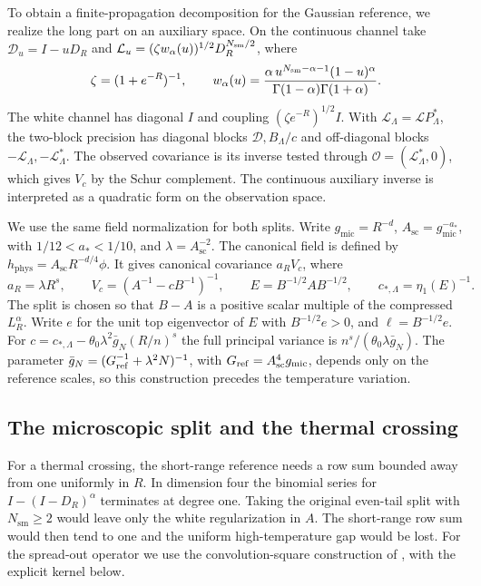 \documentclass[11pt]{article}
\theoremstyle{definition}
\begin{document}
To obtain a finite-propagation decomposition for the Gaussian
reference, we realize the long part on an auxiliary space. On the
continuous channel take
\(\mathcal D_u=I-uD_R\) and
\(\mathcal L_u=(\zeta w_\alpha(u))^{1/2}D_R^{N_{\rm sm}/2}\), where
\begin{equation}
 \zeta=(1+e^{-R})^{-1},\qquad
 w_\alpha(u)=
 \frac{\alpha\,u^{N_{\rm sm}-\alpha-1}(1-u)^\alpha}
      {\Gamma(1-\alpha)\Gamma(1+\alpha)} .
\end{equation}
The white channel has diagonal \(I\) and coupling
\((\zeta e^{-R})^{1/2}I\).
With \(\mathcal L_\Lambda=\mathcal L P_\Lambda^*\), the
two-block precision has diagonal blocks \(\mathcal D,B_\Lambda/c\)
and off-diagonal blocks \(-\mathcal L_\Lambda,-\mathcal L_\Lambda^*\).
The observed covariance is its inverse tested through
\(\mathcal O=(\mathcal L_\Lambda^*,0)\), which gives \(V_c\) by the
Schur complement. The continuous auxiliary inverse is interpreted
as a quadratic form on the observation space.

We use the same field normalization for both splits. Write
\(g_{\mathrm{mic}}=R^{-d}\),
\(A_{\mathrm{sc}}=g_{\mathrm{mic}}^{-a_*}\), with
\(1/12<a_*<1/10\), and \(\lambda=A_{\mathrm{sc}}^{-2}\).
The canonical field is defined by
\(h_{\mathrm{phys}}=A_{\mathrm{sc}} R^{-d/4}\phi\).
It gives canonical covariance \(a_R V_c\), where
\begin{equation}
 a_R=\lambda R^s,\qquad
 V_c=(A^{-1}-cB^{-1})^{-1},\qquad
 E=B^{-1/2}AB^{-1/2},\qquad c_{*,\Lambda}=\eta_1(E)^{-1}.
\end{equation}
The split is chosen so that \(B-A\) is a positive scalar multiple
of the compressed \(L_R^\alpha\). Write \(e\) for the unit top
eigenvector of \(E\) with \(B^{-1/2}e>0\), and
\(\ell=B^{-1/2}e\). For
\(c=c_{*,\Lambda}-\theta_0\lambda^2\bar g_N(R/n)^s\)
the full principal variance is
\(n^s/(\theta_0\lambda\bar g_N)\).
The parameter \(\bar g_N=(G_{\rm ref}^{-1}+\lambda^2N)^{-1}\),
with \(G_{\rm ref}=A_{\rm sc}^4g_{\mathrm{mic}}\), depends only on
the reference scales, so this construction precedes the temperature
variation.

\subsection{The microscopic split and the thermal crossing}
\label{sec:micro-extension}

For a thermal crossing, the short-range reference needs a row sum
bounded away from one uniformly in \(R\). In dimension four the
binomial series for \(I-(I-D_R)^\alpha\)
terminates at degree one. Taking the original even-tail split with
\(N_{\mathrm{sm}}\ge 2\) would leave only the white regularization in
\(A\). The short-range row sum would then tend to one and the
uniform high-temperature gap would be lost. For the spread-out
operator we use the convolution-square construction of
\cite[Section~3]{IsingCorrelation}, with the explicit kernel below.
\end{document}
